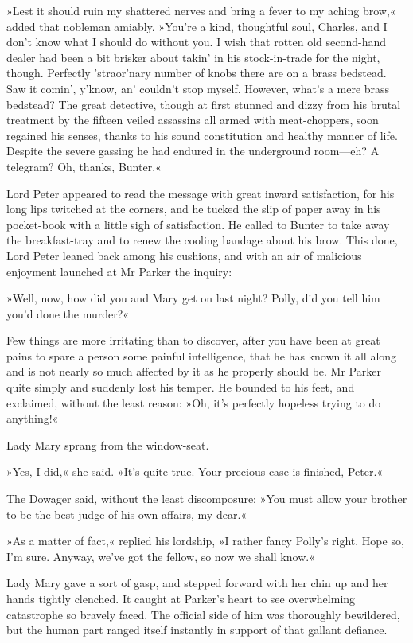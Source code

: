 »Lest it should ruin my shattered nerves and bring a fever to my aching brow,« added that nobleman amiably. »You're a kind, thoughtful soul, Charles, and I don't know what I should do without you. I wish that rotten old second-hand dealer had been a bit brisker about takin' in his stock-in-trade for the night, though. Perfectly 'straor'nary number of knobs there are on a brass bedstead. Saw it comin', y'know, an' couldn't stop myself. However, what's a mere brass bedstead? The great detective, though at first stunned and dizzy from his brutal treatment by the fifteen veiled assassins all armed with meat-choppers, soon regained his senses, thanks to his sound constitution and healthy manner of life. Despite the severe gassing he had endured in the underground room\allowbreak---\allowbreak eh? A telegram? Oh, thanks, Bunter.«

Lord Peter appeared to read the message with great inward satisfaction, for his long lips twitched at the corners, and he tucked the slip of paper away in his pocket-book with a little sigh of satisfaction. He called to Bunter to take away the breakfast-tray and to renew the cooling bandage about his brow. This done, Lord Peter leaned back among his cushions, and with an air of malicious enjoyment launched at Mr Parker the inquiry:

»Well, now, how did you and Mary get on last night? Polly, did you tell him you'd done the murder?«

Few things are more irritating than to discover, after you have been at great pains to spare a person some painful intelligence, that he has known it all along and is not nearly so much affected by it as he properly should be. Mr Parker quite simply and suddenly lost his temper. He bounded to his feet, and exclaimed, without the least reason: »Oh, it's perfectly hopeless trying to do anything!«

Lady Mary sprang from the window-seat.

»Yes, I did,« she said. »It's quite true. Your precious case is finished, Peter.«

The Dowager said, without the least discomposure: »You must allow your brother to be the best judge of his own affairs, my dear.«

»As a matter of fact,« replied his lordship, »I rather fancy Polly's right. Hope so, I'm sure. Anyway, we've got the fellow, so now we shall know.«

Lady Mary gave a sort of gasp, and stepped forward with her chin up and her hands tightly clenched. It caught at Parker's heart to see overwhelming catastrophe so bravely faced. The official side of him was thoroughly bewildered, but the human part ranged itself instantly in support of that gallant defiance.

